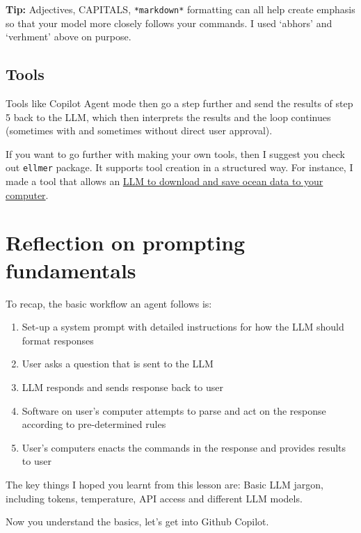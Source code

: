 \documentclass[
  letterpaper,
  DIV=11,
  numbers=noendperiod]{scrreprt}
\providecommand{\tightlist}{%
  \setlength{\itemsep}{0pt}\setlength{\parskip}{0pt}}\usepackage{longtable,booktabs,array}
\begin{document}
\textbf{Tip:} Adjectives, CAPITALS, \texttt{*markdown*} formatting can
all help create emphasis so that your model more closely follows your
commands. I used `abhors' and `verhment' above on purpose.

\subsection{Tools}\label{tools}

Tools like Copilot Agent mode then go a step further and send the
results of step 5 back to the LLM, which then interprets the results and
the loop continues (sometimes with and sometimes without direct user
approval).

If you want to go further with making your own tools, then I suggest you
check out \texttt{ellmer} package. It supports tool creation in a
structured way. For instance, I made a tool that allows an
\href{https://ellmer.tidyverse.org/articles/tool-calling.html}{LLM to
download and save ocean data to your computer}.

\section{Reflection on prompting
fundamentals}\label{reflection-on-prompting-fundamentals}

To recap, the basic workflow an agent follows is:

\begin{enumerate}
\def\labelenumi{\arabic{enumi}.}
\tightlist
\item
  Set-up a system prompt with detailed instructions for how the LLM
  should format responses
\item
  User asks a question that is sent to the LLM
\item
  LLM responds and sends response back to user
\item
  Software on user's computer attempts to parse and act on the response
  according to pre-determined rules
\item
  User's computers enacts the commands in the response and provides
  results to user
\end{enumerate}

The key things I hoped you learnt from this lesson are: Basic LLM
jargon, including tokens, temperature, API access and different LLM
models.

Now you understand the basics, let's get into Github Copilot.

\end{document}
